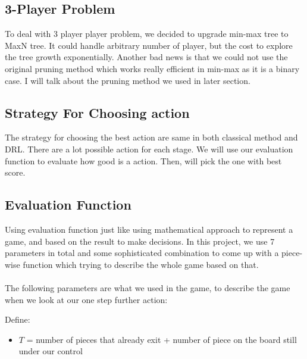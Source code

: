 \documentclass[11pt]{article}
\begin{document}
\subsection{3-Player Problem}

To deal with 3 player player problem, we decided to upgrade min-max tree to MaxN tree. It could handle arbitrary
number of player, but the cost to explore the tree growth exponentially. Another bad news is that we could not
use the original pruning method which works really efficient in min-max as it is a binary case. I will talk about
the pruning method we used in later section.

\subsection{Strategy For Choosing action}
The strategy for choosing the best action are same in both classical method and DRL. There are a lot possible 
action for each stage. We will use our evaluation function to evaluate how good is a action. Then, will pick
the one with best score.

\subsection{Evaluation Function}
Using evaluation function just like using mathematical approach to represent a game, and based on the result
to make decisions. In this project, we use 7 parameters in total and some sophisticated combination to come up 
with a piece-wise function which trying to describe the whole game based on that.
\\
\\
The following parameters are what we used in the game, to describe the game when we look at our one step further
action:

Define:
\begin{itemize}
  \item $T$ = number of pieces that already exit + number of piece on the board still under our control
\end{itemize}
\end{document}
